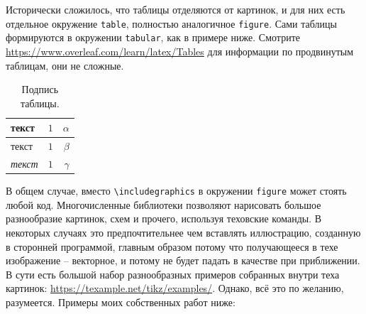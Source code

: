 \documentclass[a4paper, 14pt]{extreport}
\begin{document}
Исторически сложилось, что таблицы отделяются от картинок, и для них есть отдельное окружение \verb!table!, полностью аналогичное \verb!figure!. Сами таблицы формируются в окружении \verb!tabular!, как в примере ниже. Смотрите \url{https://www.overleaf.com/learn/latex/Tables} для информации по продвинутым таблицам, они не сложные.

\begin{table}[h]
    \centering 
    \begin{tabular}{lc|r}
        \textbf{текст} & $1$ & $\alpha$ \\
        \hline %
        текст & $1$ & $\beta$ \\
        \textit{текст} & $1$ & $\gamma$ \\
    \end{tabular}
    \caption{Подпись таблицы.}
    \label{fig:example fig 2}
\end{table}

В общем случае, вместо \verb!\includegraphics! в окружении \verb!figure! может стоять любой код. Многочисленные библиотеки позволяют нарисовать большое разнообразие картинок, схем и прочего, используя теховские команды. В некоторых случаях это предпочтительнее чем вставлять иллюстрацию, созданную в сторонней программой, главным образом потому что получающееся в техе изображение -- векторное, и потому не будет падать в качестве при приближении. В сути есть большой набор разнообразных примеров собранных внутри теха картинок: \url{https://texample.net/tikz/examples/}. Однако, всё это по желанию, разумеется. Примеры моих собственных работ ниже:
\end{document}

